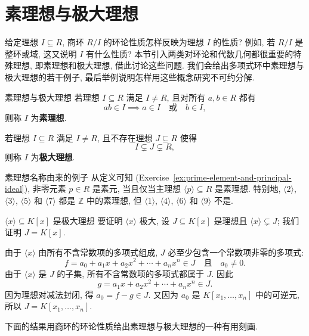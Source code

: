 \section{素理想与极大理想}\label{sec:prime-maximal-ideals}

给定理想 $I\subseteq R$, 商环 $R/I$ 的环论性质怎样反映为理想 $I$ 的性质? 例如, 若 $R/I$ 是整环或域, 这又说明 $I$ 有什么性质? 本节引入两类对环论和代数几何都很重要的特殊理想, 即素理想和极大理想, 借此讨论这些问题. 我们会给出多项式环中素理想与极大理想的若干例子, 最后举例说明怎样用这些概念研究不可约分解.

\begin{Definition}{素理想与极大理想}\label{def:prime-maximal-ideals}
  若理想 $I\subseteq R$ 满足 $I\ne R$, 且对所有 $a,b\in R$ 都有
  \[
    ab\in I\implies a\in I\quad\text{或}\quad b\in I,
  \]
  则称 $I$ 为\textbf{素理想}.

  若理想 $I\subseteq R$ 满足 $I\ne R$, 且不存在理想 $J\subseteq R$ 使得
  \[
    I\subsetneq J\subsetneq R,
  \]
  则称 $I$ 为\textbf{极大理想}.
\end{Definition}

\begin{Example}{素理想名称由来的例子}\label{ex:prime-ideal-eponymous}
  从定义可知 (Exercise~\ref{ex:prime-element-and-principal-ideal}), 非零元素 $p\in R$ 是素元, 当且仅当主理想 $\langle p\rangle\subseteq R$ 是素理想. 特别地, $\langle2\rangle$, $\langle3\rangle$, $\langle5\rangle$ 和 $\langle7\rangle$ 都是 $\mathbb{Z}$ 中的素理想, 但 $\langle1\rangle$, $\langle4\rangle$, $\langle6\rangle$ 和 $\langle9\rangle$ 不是.
\end{Example}

\begin{Example}{{\textmd{$\langle x\rangle\subseteq K[x]$} 是极大理想}}\label{ex:linear-ideal-maximal}
  要证明 $\langle x\rangle$ 极大, 设 $J\subseteq K[x]$ 是理想且 $\langle x\rangle\subsetneq J$; 我们证明 $J=K[x]$.

  由于 $\langle x\rangle$ 由所有不含常数项的多项式组成, $J$ 必至少包含一个常数项非零的多项式:
  \[
    f=a_{0}+a_{1}x+a_{2}x^{2}+\cdots+a_{n}x^{n}\in J
    \quad\text{且}\quad a_{0}\ne0.
  \]
  由于 $\langle x\rangle$ 是 $J$ 的子集, 所有不含常数项的多项式都属于 $J$. 因此
  \[
    g=a_{1}x+a_{2}x^{2}+\cdots+a_{n}x^{n}\in J.
  \]
  因为理想对减法封闭, 得 $a_{0}=f-g\in J$. 又因为 $a_{0}$ 是 $K[x_{1},\ldots,x_{n}]$ 中的可逆元, 所以 $J=K[x_{1},\ldots,x_{n}]$.
\end{Example}

下面的结果用商环的环论性质给出素理想与极大理想的一种有用刻画.


